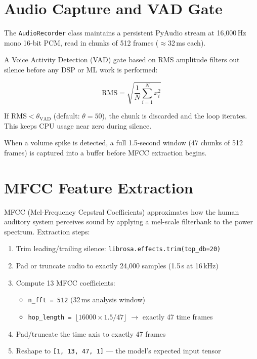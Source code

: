 \documentclass[12pt, a4paper]{report}
\begin{document}
\section{Audio Capture and VAD Gate}

The \texttt{AudioRecorder} class maintains a persistent PyAudio stream at 16{,}000\,Hz
mono 16-bit PCM, read in chunks of 512 frames ($\approx$32\,ms each).

A Voice Activity Detection (VAD) gate based on RMS amplitude filters out silence before
any DSP or ML work is performed:

\begin{equation}
  \mathrm{RMS} = \sqrt{\frac{1}{N} \sum_{i=1}^{N} x_i^2}
\end{equation}

If $\mathrm{RMS} < \theta_{\mathrm{VAD}}$ (default: $\theta = 50$), the chunk is
discarded and the loop iterates. This keeps CPU usage near zero during silence.

When a volume spike is detected, a full 1.5-second window (47 chunks of 512 frames)
is captured into a buffer before MFCC extraction begins.

\section{MFCC Feature Extraction}

MFCC (Mel-Frequency Cepstral Coefficients) approximates how the human auditory system
perceives sound by applying a mel-scale filterbank to the power spectrum. Extraction
steps:

\begin{enumerate}[noitemsep]
  \item Trim leading/trailing silence: \texttt{librosa.effects.trim(top\_db=20)}
  \item Pad or truncate audio to exactly 24{,}000 samples (1.5\,s at 16\,kHz)
  \item Compute 13 MFCC coefficients:
        \begin{itemize}[noitemsep]
          \item \texttt{n\_fft = 512} (32\,ms analysis window)
          \item \texttt{hop\_length = $\lfloor 16000 \times 1.5 / 47 \rfloor$}
                $\rightarrow$ exactly 47 time frames
        \end{itemize}
  \item Pad/truncate the time axis to exactly 47 frames
  \item Reshape to \texttt{[1, 13, 47, 1]} --- the model's expected input tensor
\end{enumerate}
\end{document}
